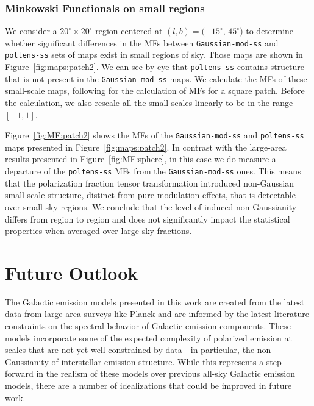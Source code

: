\documentclass[twocolumn]{aastex631}
\begin{document}
\subsubsection{Minkowski Functionals on small regions}
We consider a $20^{\circ}\times20^{\circ}$ region centered at $(l, b) = (-15^{\circ}$, $45^{\circ})$ to determine whether significant differences in the MFs between \texttt{Gaussian-mod-ss} and \texttt{poltens-ss} sets of maps exist in small regions of sky. Those maps are shown in Figure~\ref{fig:maps:patch2}. We can see by eye that \texttt{poltens-ss} contains structure that is not present in the \texttt{Gaussian-mod-ss} maps. We calculate the MFs of these small-scale maps, following \cite{Mantz:2008} for the calculation of MFs for a square patch. Before the calculation, we also rescale all the small scales linearly to be in the range $[-1, 1]$.

Figure~\ref{fig:MF:patch2} shows the MFs of the \texttt{Gaussian-mod-ss} and \texttt{poltens-ss} maps presented in Figure~\ref{fig:maps:patch2}. In contrast with the large-area results presented in Figure~\ref{fig:MF:sphere}, in this case we do measure a departure of the \texttt{poltens-ss} MFs from the \texttt{Gaussian-mod-ss} ones. This means that the polarization fraction tensor transformation introduced non-Gaussian small-scale structure, distinct from pure modulation effects, that is detectable over small sky regions. We conclude that the level of induced non-Gaussianity differs from region to region and does not significantly impact the statistical properties when averaged over large sky fractions.

\section{Future Outlook} \label{sec:discussion}

The Galactic emission models presented in this work are created from the latest data from large-area surveys like Planck and are informed by the latest literature constraints on the spectral behavior of Galactic emission components. These models incorporate some of the expected complexity of polarized emission at scales that are not yet well-constrained by data---in particular, the non-Gaussianity of interstellar emission structure. While this represents a step forward in the realism of these models over previous all-sky Galactic emission models, there are a number of idealizations that could be improved in future work.
\end{document}
